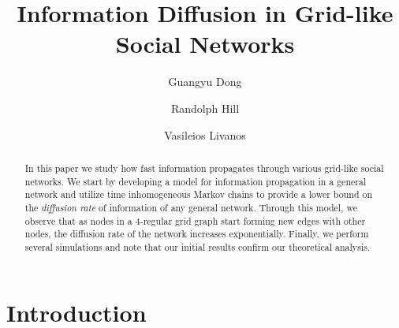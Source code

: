 \documentclass[format=acmsmall, review=false]{acmart}
\begin{document}
\title[Information Diffusion in Grid-like Social Networks]{Information Diffusion in Grid-like Social Networks}  
\author{Guangyu Dong}
\author{Randolph Hill}
\author{Vasileios Livanos}


\begin{abstract}
\par In this paper we study how fast information propagates through various grid-like social networks. We
start by developing a model for information propagation in a general network and utilize time inhomogeneous
Markov chains to provide a lower bound on the \textit{diffusion rate} of information of any
general network. Through this model, we observe that as nodes in a $4$-regular grid graph start forming
new edges with other nodes, the diffusion rate of the network increases exponentially. Finally, we perform
several simulations and note that our initial results confirm our theoretical analysis.
\end{abstract}


\maketitle


\section{Introduction}
\end{document}
